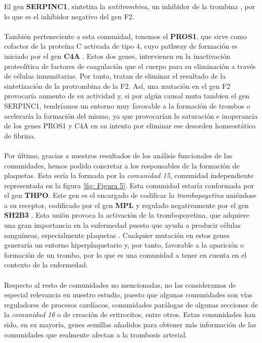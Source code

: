 El gen \textbf{SERPINC1}, sintetiza la \textit{antitrombina}, un inhibidor de la trombina \cite{SERPINC1}, por lo que es el inhibidor negativo del gen F2. \\\\
También perteneciente a esta comunidad, tenemos el \textbf{PROS1}, que sirve como cofactor de la proteína C activada de tipo 4, cuyo pathway de formación es iniciado por el gen \textbf{C4A} \cite{PROS1}. Estos dos genes, intervienen en la inactivación proteolítica de factores de coagulación que el cuerpo para su eliminación a través de células inmunitarias. Por tanto, tratan de eliminar el resultado de la sintetización de la protrombina de la F2. Así, una mutación en el gen F2 provocaría aumento de su actividad y, si por algún causal muta tambien el gen SERPINC1, tendríamos un entorno muy favorable a la formación de trombos o aceleraría la formación del mismo, ya que provocarían la saturación e inoperancia de los genes PROS1 y C4A en su intento por eliminar ese desorden homeostático de fibrina.\\\\
Por último, gracias a nuestros resultados de los análisis funcionales de las comunidades, hemos podido concretar a los responsables de la formación de plaquetas. Esta sería la formada por la \textit{comunidad 15}, comunidad independiente representada en la figura \ref{fig: Figura 5}. Esta comunidad estaría conformada por el gen \textbf{THPO}. Este gen es el encargado de codificar la \textit{trombopoyetina} uniéndose a su receptor\cite{THPO_MPL}, codificado por el gen \textbf{MPL} \cite{THPO_MPL} y regulado negativamente por el gen \textbf{SH2B3} \cite{SH2B3}. Esta unión provoca la activación de la trombopoyetina, que adquiere una gran importancia en la enfermedad puesto que ayuda a producir células sanguíneas, especialmente plaquetas \cite{THPO_MPL}. Cualquier mutación en estos genes generaría un entorno hiperplaquetario y, por tanto, favorable a la aparición o formación de un trombo, por lo que es una comunidad a tener en cuenta en el contexto de la enfermedad.\\\\
Respecto al resto de comunidades no mencionadas, no las consideramos de especial relevancia en nuestro estudio, puesto que algunas comunidades son vías reguladores de procesos cardíacos, comunidades parálogas de algunas secciones de la \textit{comunidad 16} o de creación de eritrocitos, entre otros. Estas comunidades han sido, en su mayoría, genes semillas añadidos para obtener más información de las comunidades que realmente afectan a la trombosis arterial.


